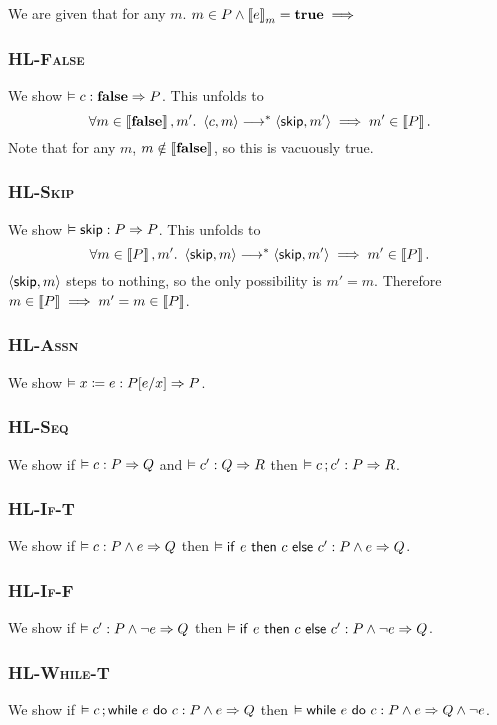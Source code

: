 We are given that for any $m$. $m \in P \wedge \Eval(e,m) = \True \implies $

\subsubsection*{\textsc{HL-False}}
We show $\VAL \Triple c : \EFalse => P$.
This unfolds to
\[
    \forall m \in \Interp{\EFalse}, m'.\
    \Cfg(c, m) \sstepstotrans \Cfg(\Skip, m') 
    \implies m' \in \Interp{P}.
\]
Note that for any $m$, $m \notin \left\llbracket \textbf{false} \right\rrbracket$,
so this is vacuously true.

\subsubsection*{\textsc{HL-Skip}}
We show $\VAL \Triple \Skip : P => P$.
This unfolds to 
$$\forall m \in \Interp{P}, m'.\
\Cfg(\Skip,m) \sstepstotrans \Cfg(\Skip,m') \implies
m' \in \Interp{P}.$$
$\Cfg(\Skip,m)$ steps to nothing,
so the only possibility is $m' = m$.
Therefore $m \in \left\llbracket P \right\rrbracket \implies m' = m \in \left\llbracket P \right\rrbracket$.

\subsubsection*{\textsc{HL-Assn}}
We show $\VAL \Triple \Assn x = e : \Subst P[e/x] => P$.

\subsubsection*{\textsc{HL-Seq}}
We show if $\VAL \Triple c : P => Q$ and $\VAL \Triple c' : Q => R$
then $\VAL \Triple \Seq c;c' : P => R$.
    
\subsubsection*{\textsc{HL-If-T}}
We show if $\VAL \Triple c : P \wedge e => Q$ then
    $\VAL \Triple \ITE e then c else c' : P \wedge e => Q$.

\subsubsection*{\textsc{HL-If-F}}
We show if $\VAL \Triple c' : P \wedge \neg e => Q$ then
    $\VAL \Triple \ITE e then c else c' : P \wedge \neg e => Q$.

\subsubsection*{\textsc{HL-While-T}}
We show if $\VAL \Triple \Seq c; \While e do c : P \wedge e => Q$ then
    $\VAL \Triple \While e do c : P \wedge e => Q \wedge \neg e$. 
\todo{todo}

